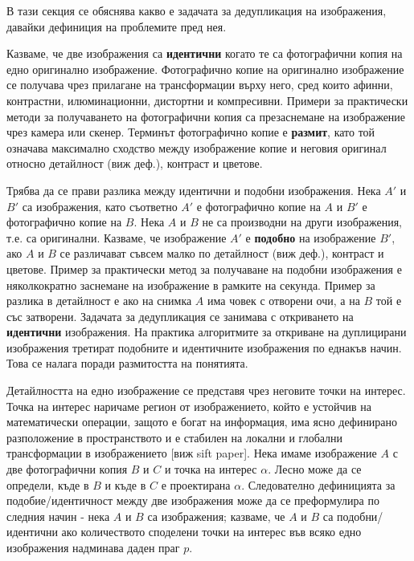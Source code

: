 \documentclass[a4paper,12pt]{article}
\begin{document}
В тази секция се обяснява какво е задачата за дедупликация на изображения, давайки дефиниция на проблемите пред нея.

\bigbreak

Казваме, че две изображения са \textbf{идентични} когато те са фотографични копия на едно оригинално изображение. Фотографично копие на оригинално изображение се получава чрез прилагане на трансформации върху него, сред които афинни, контрастни, илюминационни, дистортни и компресивни. Примери за практически методи за получаването на фотографични копия са презаснемане на изображение чрез камера или скенер. Терминът фотографично копие е \textbf{размит}, като той означава максимално сходство между изображение копие и неговия оригинал относно детайлност (виж деф.), контраст и цветове.

\bigbreak

Трябва да се прави разлика между идентични и подобни изображения. Нека $A'$ и $B'$ са изображения, като съответно $A'$ е фотографично копие на $A$ и $B'$ е фотографично копие на $B$. Нека $A$ и $B$ не са производни на други изображения, т.е. са оригинални. Казваме, че изображение $A'$ е \textbf{подобно} на изображение $B'$, ако $A$ и $B$ се различават съвсем малко по детайлност (виж деф.), контраст и цветове. Пример за практически метод за получаване на подобни изображения е няколкократно заснемане на изображение в рамките на секунда. Пример за разлика в детайлност е ако на снимка $A$ има човек с отворени очи, а на $B$ той е със затворени. Задачата за дедупликация се занимава с откриването на \textbf{идентични} изображения. На практика алгоритмите за откриване на дуплицирани изображения третират подобните и идентичните изображения по еднакъв начин. Това се налага поради размитостта на понятията. 

\bigbreak

Детайлността на едно изображение се представя чрез неговите точки на интерес. Точка на интерес наричаме регион от изображението, който е устойчив на математически операции, защото е богат на информация, има ясно дефинирано разположение в пространството и е стабилен на локални и глобални трансформации в изображението [виж sift paper]. Нека имаме изображение $A$ с две фотографични копия $B$ и $C$ и точка на интерес $\alpha$. Лесно може да се определи, къде в $B$ и къде в $C$ е проектирана $\alpha$. Следователно дефиницията за подобие/идентичност между две изображения може да се преформулира по следния начин - нека $A$ и $B$ са изображения; казваме, че $A$ и $B$ са подобни/идентични ако количеството споделени точки на интерес във всяко едно изображения надминава даден праг $p$.
\end{document}
